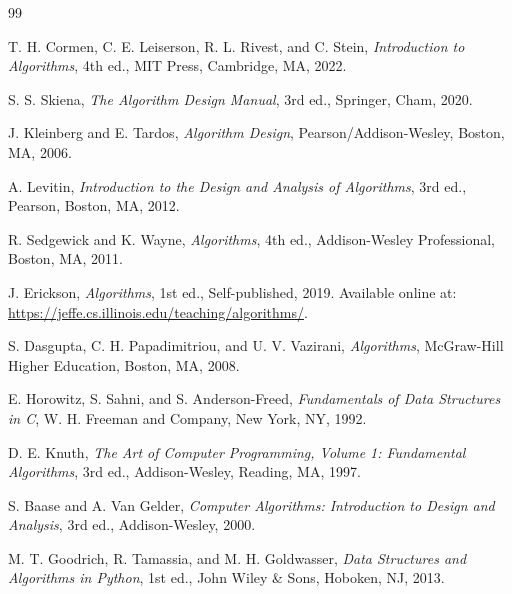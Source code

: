 \documentclass[b5paper, utf8, 11pt, colorlinks]{book}
\begin{document}


\backmatter
\begin{thebibliography}{99}
	
	
	T. H. Cormen, C. E. Leiserson, R. L. Rivest, and C. Stein,
	\textit{Introduction to Algorithms},
	4th ed.,
	MIT Press, Cambridge, MA, 2022.
	
	S. S. Skiena,
	\textit{The Algorithm Design Manual},
	3rd ed.,
	Springer, Cham, 2020.
	
	J. Kleinberg and E. Tardos,
	\textit{Algorithm Design},
	Pearson/Addison-Wesley, Boston, MA, 2006.
	
	A. Levitin,
	\textit{Introduction to the Design and Analysis of Algorithms},
	3rd ed.,
	Pearson, Boston, MA, 2012.
	
	R. Sedgewick and K. Wayne,
	\textit{Algorithms},
	4th ed.,
	Addison-Wesley Professional, Boston, MA, 2011.
	
	J. Erickson,
	\textit{Algorithms},
	1st ed.,
	Self-published, 2019.
	Available online at:
	\url{https://jeffe.cs.illinois.edu/teaching/algorithms/}.
	
	S. Dasgupta, C. H. Papadimitriou, and U. V. Vazirani,
	\textit{Algorithms},
	McGraw-Hill Higher Education, Boston, MA, 2008.
	
	E. Horowitz, S. Sahni, and S. Anderson-Freed,
	\textit{Fundamentals of Data Structures in C},
	W. H. Freeman and Company, New York, NY, 1992.
	
	D. E. Knuth,
	\textit{The Art of Computer Programming, Volume 1:
		Fundamental Algorithms},
	3rd ed.,
	Addison-Wesley, Reading, MA, 1997.
	
	
	
	S. Baase and A. Van Gelder,
	\textit{Computer Algorithms: Introduction to Design and Analysis},
	3rd ed.,
	Addison-Wesley, 2000.
	
	M. T. Goodrich, R. Tamassia, and M. H. Goldwasser,
	\textit{Data Structures and Algorithms in Python},
	1st ed.,
	John Wiley \& Sons, Hoboken, NJ, 2013.
	

\end{thebibliography}
\end{document}

